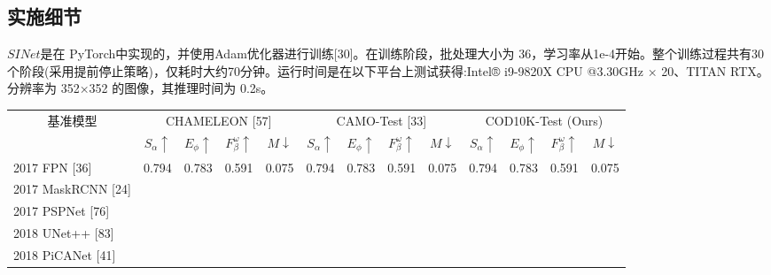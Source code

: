 \documentclass[final]{cvpr}
\begin{document}
\subsection{实施细节}
$SINet$是在 PyTorch中实现的，并使用Adam优化器进行训练[30]。在训练阶段，批处理大小为 36，学习率从1e-4开始。整个训练过程共有30个阶段(采用提前停止策略)，仅耗时大约70分钟。运行时间是在以下平台上测试获得:Intel® i9-9820X CPU @3.30GHz × 20、TITAN RTX。分辨率为 352×352 的图像，其推理时间为 0.2s。
\begin{table}[pb]
\resizebox{\textwidth}{!}
    {
        \begin{tabular}{l|llll||llll||llll}
        \hline
        \multicolumn{1}{c|}{\multirow{2}{*}{基准模型}} &
          \multicolumn{4}{c||}{CHAMELEON {[}57{]}} &
          \multicolumn{4}{c||}{CAMO-Test {[}33{]}} &
          \multicolumn{4}{c}{COD10K-Test   (Ours)} \\ \cline{2-13} 
        \multicolumn{1}{c|}{} &
          \multicolumn{1}{c}{$S_{\alpha } \uparrow$ } &
          \multicolumn{1}{c}{$E_{\phi } \uparrow$ } &
          \multicolumn{1}{c}{$F_{\beta }^{\omega } \uparrow $} &
          \multicolumn{1}{c||}{$M\downarrow $} &
          \multicolumn{1}{c}{$S_{\alpha } \uparrow$} &
          \multicolumn{1}{c}{$E_{\phi } \uparrow$} &
          \multicolumn{1}{c}{$F_{\beta }^{\omega } \uparrow $} &
          \multicolumn{1}{c||}{$M\downarrow $} &
          \multicolumn{1}{c}{$S_{\alpha } \uparrow$} &
          \multicolumn{1}{c}{$E_{\phi } \uparrow$} &
          \multicolumn{1}{c}{$F_{\beta }^{\omega } \uparrow $} &
          \multicolumn{1}{c}{$M\downarrow $} \\ \hline
        2017 FPN {[}36{]}               & 0.794 & 0.783 & 0.591 & 0.075 & 0.794 & 0.783 & 0.591 & 0.075 & 0.794 & 0.783 & 0.591 & 0.075 \\
        2017 MaskRCNN {[}24{]}          &       &       &       &       &       &       &       &       &       &       &       &       \\
        2017 PSPNet {[}76{]}            &       &       &       &       &       &       &       &       &       &       &       &       \\
        2018 UNet++ {[}83{]}            &       &       &       &       &       &       &       &       &       &       &       &       \\
        2018 PiCANet {[}41{]}           &       &       &       &       &       &       &       &       &       &       &       &       \\

\end{tabular}}
\end{table}
\end{document}
